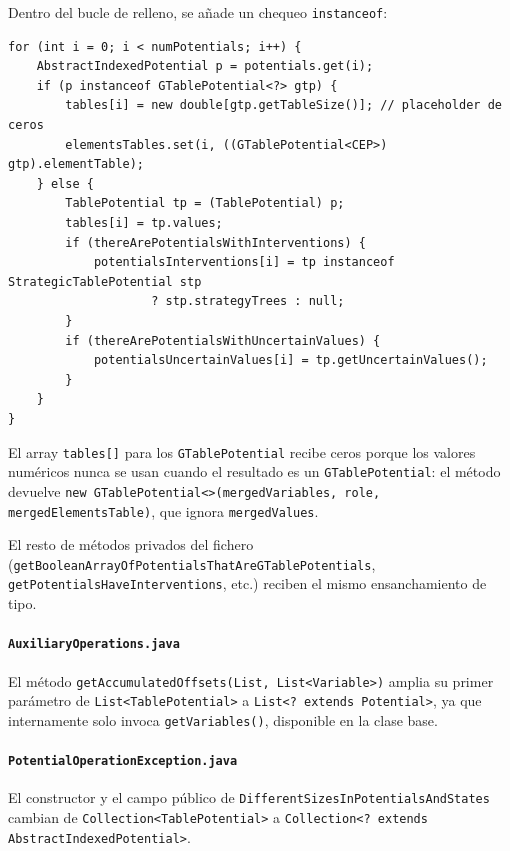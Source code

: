 \documentclass[11pt,a4paper]{article}
\newcommand{\code}[1]{\texttt{#1}}
\begin{document}
Dentro del bucle de relleno, se añade un chequeo \code{instanceof}:

\begin{lstlisting}[caption={Bucle de relleno adaptado en \texttt{TablePotentialMerge.merge()}}]
for (int i = 0; i < numPotentials; i++) {
    AbstractIndexedPotential p = potentials.get(i);
    if (p instanceof GTablePotential<?> gtp) {
        tables[i] = new double[gtp.getTableSize()]; // placeholder de ceros
        elementsTables.set(i, ((GTablePotential<CEP>) gtp).elementTable);
    } else {
        TablePotential tp = (TablePotential) p;
        tables[i] = tp.values;
        if (thereArePotentialsWithInterventions) {
            potentialsInterventions[i] = tp instanceof StrategicTablePotential stp
                    ? stp.strategyTrees : null;
        }
        if (thereArePotentialsWithUncertainValues) {
            potentialsUncertainValues[i] = tp.getUncertainValues();
        }
    }
}
\end{lstlisting}

El array \code{tables[]} para los \code{GTablePotential} recibe ceros porque los
valores numéricos nunca se usan cuando el resultado es un \code{GTablePotential}:
el método devuelve \code{new GTablePotential<>(mergedVariables,\,role,\,mergedElementsTable)},
que ignora \code{mergedValues}.

El resto de métodos privados del fichero (\code{getBooleanArray\-Of\-Potentials\-That\-Are\-GTable\-Potentials},
\code{getPotentialsHaveInterventions}, etc.) reciben el mismo ensanchamiento de tipo.

\paragraph{\code{AuxiliaryOperations.java}}

El método \code{getAccumulatedOffsets(List,\,List<Variable>)} amplia su primer
parámetro de \code{List<TablePotential>} a \code{List<? extends Potential>},
ya que internamente solo invoca \code{getVariables()}, disponible en la clase base.

\paragraph{\code{PotentialOperationException.java}}

El constructor y el campo público de
\code{Different\-Sizes\-In\-Potentials\-And\-States} cambian de
\code{Collection<TablePotential>} a
\code{Collection<? extends Abstract\-Indexed\-Potential>}.
\end{document}
